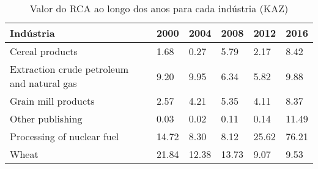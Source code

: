 \begin{table}
\centering
\caption{Valor do RCA ao longo dos anos para cada indústria (KAZ)}
\label{tab:ex3-tempo-KAZ}
\begin{tabular}{p{6cm}p{1.5cm}p{1.5cm}p{1.5cm}p{1.5cm}p{1.5cm}}
\toprule
                                 Indústria &  2000 &  2004 &  2008 &  2012 &  2016 \\
\midrule
                           Cereal products &  1.68 &  0.27 &  5.79 &  2.17 &  8.42 \\
Extraction crude petroleum and natural gas &  9.20 &  9.95 &  6.34 &  5.82 &  9.88 \\
                       Grain mill products &  2.57 &  4.21 &  5.35 &  4.11 &  8.37 \\
                          Other publishing &  0.03 &  0.02 &  0.11 &  0.14 & 11.49 \\
                Processing of nuclear fuel & 14.72 &  8.30 &  8.12 & 25.62 & 76.21 \\
                                     Wheat & 21.84 & 12.38 & 13.73 &  9.07 &  9.53 \\
\bottomrule
\end{tabular}
\end{table}
